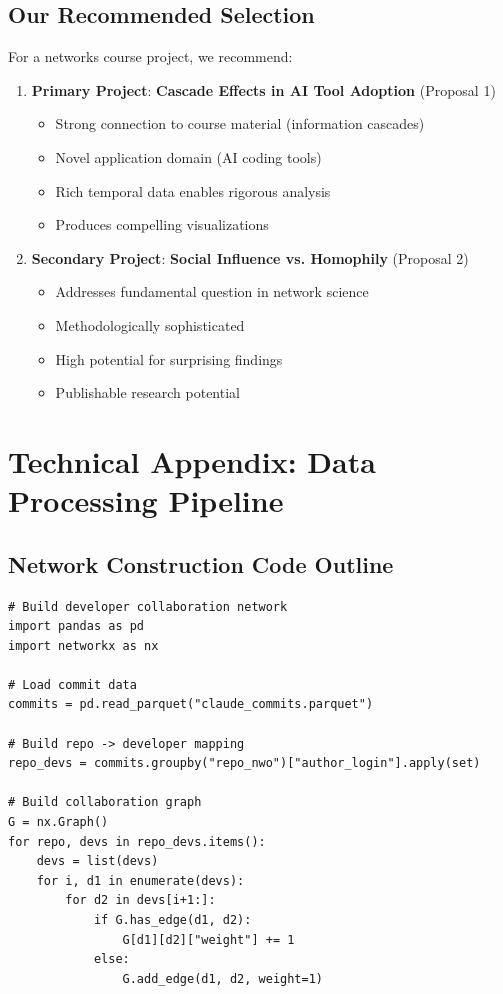 \documentclass[11pt,letterpaper]{article}
\begin{document}
\subsection{Our Recommended Selection}

For a networks course project, we recommend:

\begin{enumerate}
    \item \textbf{Primary Project}: \textbf{Cascade Effects in AI Tool Adoption} (Proposal 1)
    \begin{itemize}
        \item Strong connection to course material (information cascades)
        \item Novel application domain (AI coding tools)
        \item Rich temporal data enables rigorous analysis
        \item Produces compelling visualizations
    \end{itemize}

    \item \textbf{Secondary Project}: \textbf{Social Influence vs. Homophily} (Proposal 2)
    \begin{itemize}
        \item Addresses fundamental question in network science
        \item Methodologically sophisticated
        \item High potential for surprising findings
        \item Publishable research potential
    \end{itemize}
\end{enumerate}

\section{Technical Appendix: Data Processing Pipeline}

\subsection{Network Construction Code Outline}

\begin{verbatim}
# Build developer collaboration network
import pandas as pd
import networkx as nx

# Load commit data
commits = pd.read_parquet("claude_commits.parquet")

# Build repo -> developer mapping
repo_devs = commits.groupby("repo_nwo")["author_login"].apply(set)

# Build collaboration graph
G = nx.Graph()
for repo, devs in repo_devs.items():
    devs = list(devs)
    for i, d1 in enumerate(devs):
        for d2 in devs[i+1:]:
            if G.has_edge(d1, d2):
                G[d1][d2]["weight"] += 1
            else:
                G.add_edge(d1, d2, weight=1)
\end{verbatim}
\end{document}
